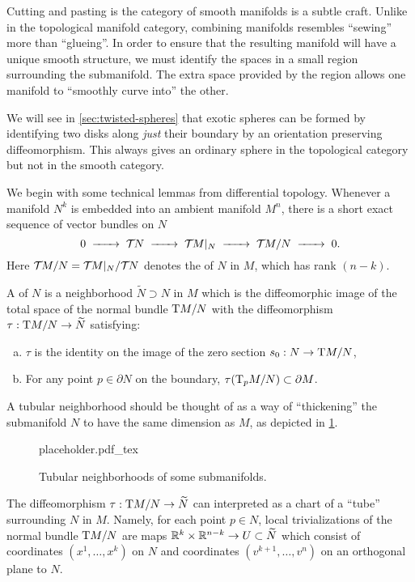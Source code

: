 Cutting and pasting is the category of smooth manifolds is a subtle craft. 
Unlike in the topological manifold category, combining manifolds resembles ``sewing'' more than ``glueing''. In order to ensure that the resulting manifold will have a unique smooth structure, we must identify the spaces in a small region surrounding the submanifold. The extra space provided by the region allows one manifold to ``smoothly curve into'' the other.

\begin{remark} 
	We will see in \cref{sec:twisted-spheres} that exotic spheres can be formed by identifying two disks along \emph{just} their boundary by an orientation preserving diffeomorphism. This always gives an ordinary sphere in the topological category but not in the smooth category.
\end{remark}

We begin with some technical lemmas from differential topology. Whenever a manifold $N^k$ is embedded into an ambient manifold $M^n$, there is a short exact sequence of vector bundles on $N$
\begin{equation}
	0 \lkxto \TT N\lkxto \TT M|_N \lkxto \TT M/N \lkxto 0.
\end{equation}
Here ${\mathcal{T}\hspace{-0.1em}} M/N={\mathcal{T}\hspace{-0.1em}} M|_N / {\mathcal{T}\hspace{-0.1em}} N$ denotes the  of $N$ in $M$, which has rank $(n-k)$.

A  of $N$ is a neighborhood $\widetilde{N}\supset N$ in $M$ which is the diffeomorphic image of the total space of the normal bundle $\mathrm{T} M/N$ with the diffeomorphism $\tau : \mathrm{T} M/N \to \widetilde{N}$ satisfying:
\begin{enumerate}[(a)]
	\item $\tau$ is the identity on the image of the zero section $s_0 : N \to \mathrm{T} M/N$,
	\item For any point $p\in \partial N$ on the boundary, $\tau(\mathrm{T}_p M/N)\subset \partial M$.
\end{enumerate}


A tubular neighborhood should be thought of as a way of ``thickening'' the submanifold $N$ to have the same dimension as $M$, as depicted in \cref{fig:tubular-neighborhood}. 

\begin{figure}[ht]
	\centering
	{placeholder.pdf_tex}
	\caption{Tubular neighborhoods of some submanifolds.}\label{fig:tubular-neighborhood}
\end{figure}

The diffeomorphism $\tau : \mathrm{T} M/N \to \widetilde{N}$ can interpreted as a chart of a ``tube'' surrounding $N$ in $M$. Namely, for each point $p\in N$, local trivializations of the normal bundle $\mathrm{T} M/N$ are maps $\mathbb{R}^k \times \mathbb{R}^{n-k}\to U\subset \widetilde{N}$ which consist of coordinates $(x^1,\ldots,x^k)$ on $N$ and coordinates $(v^{k+1},\ldots, v^{n})$ on an orthogonal plane to $N$.

